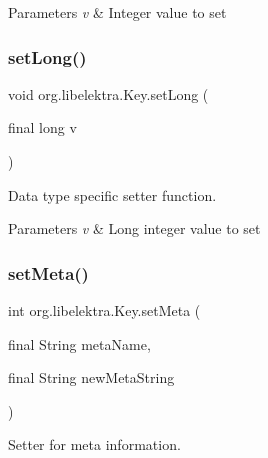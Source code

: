 \begin{DoxyParams}{Parameters}
{\em v} & Integer value to set \\
\hline
\end{DoxyParams}
\mbox{\label{classorg_1_1libelektra_1_1Key_ac02de55fc0a3eb10372de7fa146db937}} 
\subsubsection{\texorpdfstring{set\+Long()}{setLong()}}
{\footnotesize\ttfamily void org.\+libelektra.\+Key.\+set\+Long (\begin{DoxyParamCaption}\item[{final long}]{v }\end{DoxyParamCaption})\hspace{0.3cm}{\ttfamily [inline]}}



Data type specific setter function. 


\begin{DoxyParams}{Parameters}
{\em v} & Long integer value to set \\
\hline
\end{DoxyParams}
\mbox{\label{classorg_1_1libelektra_1_1Key_ac8c73ca3d16cf4454bd326ebe469cf2d}} 
\subsubsection{\texorpdfstring{set\+Meta()}{setMeta()}}
{\footnotesize\ttfamily int org.\+libelektra.\+Key.\+set\+Meta (\begin{DoxyParamCaption}\item[{final String}]{meta\+Name,  }\item[{final String}]{new\+Meta\+String }\end{DoxyParamCaption})\hspace{0.3cm}{\ttfamily [inline]}}



Setter for meta information. 


